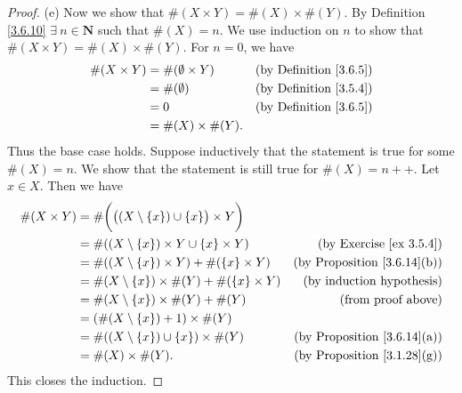 \begin{proof}{(e)}
    Now we show that \(\#(X \times Y) = \#(X) \times \#(Y)\).
    By Definition \ref{3.6.10} \(\exists\ n \in \mathbf{N}\) such that \(\#(X) = n\).
    We use induction on \(n\) to show that \(\#(X \times Y) = \#(X) \times \#(Y)\).
    For \(n = 0\), we have
    \begin{align*}
        \#(X \times Y) & = \#(\emptyset \times Y) & \text{(by Definition \ref{3.6.5})} \\
                       & = \#(\emptyset)          & \text{(by Definition \ref{3.5.4})} \\
                       & = 0                      & \text{(by Definition \ref{3.6.5})} \\
                       & = \#(X) \times \#(Y).
    \end{align*}
    Thus the base case holds.
    Suppose inductively that the statement is true for some \(\#(X) = n\).
    We show that the statement is still true for \(\#(X) = n++\).
    Let \(x \in X\).
    Then we have
    \begin{align*}
        \#(X \times Y) & = \#\bigg(\big((X \setminus \{x\}) \cup \{x\}\big) \times Y\bigg)                                           \\
                       & = \#((X \setminus \{x\}) \times Y \cup \{x\} \times Y)            & \text{(by Exercise \ref{ex 3.5.4})}     \\
                       & = \#((X \setminus \{x\}) \times Y) + \#(\{x\} \times Y)           & \text{(by Proposition \ref{3.6.14}(b))} \\
                       & = \#(X \setminus \{x\}) \times \#(Y) + \#(\{x\} \times Y)         & \text{(by induction hypothesis)}        \\
                       & = \#(X \setminus \{x\}) \times \#(Y) + \#(Y)                      & \text{(from proof above)}               \\
                       & = (\#(X \setminus \{x\}) + 1) \times \#(Y)                                                                  \\
                       & = \#((X \setminus \{x\}) \cup \{x\}) \times \#(Y)                 & \text{(by Proposition \ref{3.6.14}(a))} \\
                       & = \#(X) \times \#(Y).                                             & \text{(by Proposition \ref{3.1.28}(g))}
    \end{align*}
    This closes the induction.
\end{proof}

